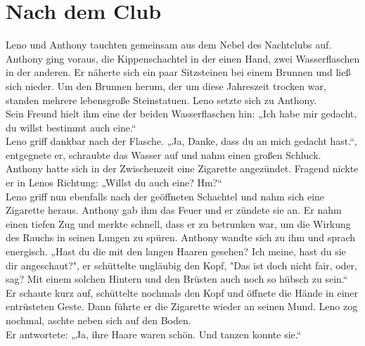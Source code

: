 \documentclass[ngerman,smalldemyvopaper,11pt,oneside,onecolumn,openright,extrafontsizes]{memoir}
\begin{document}
\chapter{Nach dem Club}
Leno und Anthony tauchten gemeinsam aus dem Nebel des Nachtclubs auf. Anthony ging voraus, die Kippenschachtel in der einen Hand, zwei Wasserflaschen in der anderen. Er näherte sich ein paar Sitzsteinen bei einem Brunnen und ließ sich nieder. Um den Brunnen herum, der um diese Jahreszeit trocken war, standen mehrere lebensgroße Steinstatuen. Leno setzte sich zu Anthony.
\vspace{0.5em} \\
Sein Freund hielt ihm eine der beiden Wasserflaschen hin: „Ich habe mir gedacht, du willst bestimmt auch eine.“
\vspace{0.5em} \\
Leno griff dankbar nach der Flasche. „Ja, Danke, dass du an mich gedacht hast.“, entgegnete er, schraubte das Wasser auf und nahm einen großen Schluck.
\vspace{0.5em} \\
Anthony hatte sich in der Zwischenzeit eine Zigarette angezündet. Fragend nickte er in Lenos Richtung: „Willst du auch eine? Hm?“
\vspace{0.5em} \\
Leno griff nun ebenfalls nach der geöffneten Schachtel und nahm sich eine Zigarette heraus. Anthony gab ihm das Feuer und er zündete sie an. Er nahm einen tiefen Zug und merkte schnell, dass er zu betrunken war, um die Wirkung des Rauchs in seinen Lungen zu spüren. Anthony wandte sich zu ihm und sprach energisch.
„Hast du die mit den langen Haaren gesehen? Ich meine, hast du sie dir angeschaut?", er schüttelte ungläubig den Kopf, "Das ist doch nicht fair, oder, sag? Mit einem solchen Hintern und den Brüsten auch noch so hübsch zu sein.“ Er schaute kurz auf, schüttelte nochmals den Kopf und öffnete die Hände in einer entrüsteten Geste. Dann führte er die Zigarette wieder an seinen Mund. Leno zog nochmal, aschte neben sich auf den Boden.
\vspace{0.5em} \\
Er antwortete: „Ja, ihre Haare waren schön. Und tanzen konnte sie.“
\vspace{0.5em} \\
\end{document}
